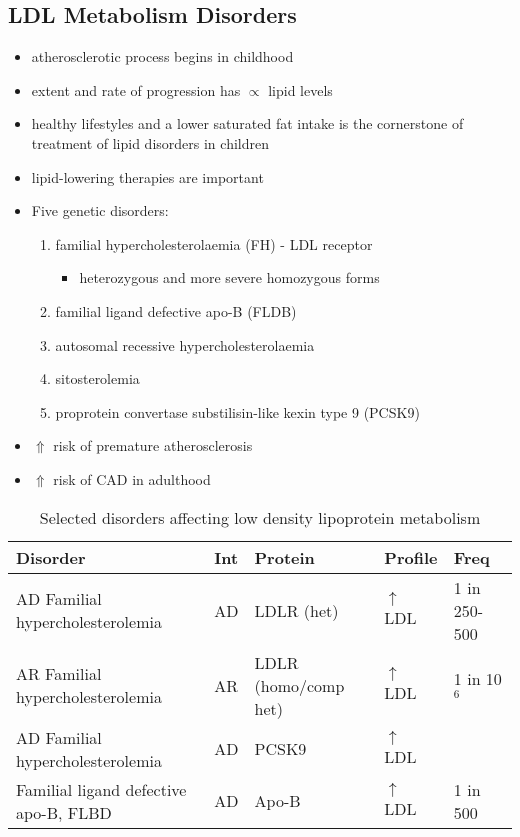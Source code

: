 \documentclass{scrartcl}
\begin{document}
\subsection{LDL Metabolism Disorders}
\label{sec:org0538d71}
\begin{itemize}
\item atherosclerotic process begins in childhood
\item extent and rate of progression has \(\propto\) lipid levels
\item healthy lifestyles and a lower saturated fat intake is the
cornerstone of treatment of lipid disorders in children
\item lipid-lowering therapies are important

\item Five genetic disorders:
\begin{enumerate}
\item familial hypercholesterolaemia (FH) - LDL receptor
\begin{itemize}
\item heterozygous and more severe homozygous forms
\end{itemize}
\item familial ligand defective apo-B (FLDB)
\item autosomal recessive hypercholesterolaemia
\item sitosterolemia
\item proprotein convertase substilisin-like kexin type 9 (PCSK9)
\end{enumerate}
\item \(\Uparrow\) risk of premature atherosclerosis
\item \(\Uparrow\) risk of CAD in adulthood
\end{itemize}

\begin{table}[htbp]
\caption{\label{tab:orgfcc75bd}
Selected disorders affecting low density lipoprotein metabolism}
\centering
\begin{tabular}{lllll}
Disorder & Int & Protein & Profile & Freq\\
\hline
AD Familial hypercholesterolemia & AD & LDLR (het) & \(\uparrow\) LDL & 1 in 250-500\\
AR Familial hypercholesterolemia & AR & LDLR (homo/comp het) & \(\uparrow\) LDL & 1 in 10\(^{\text{6}}\)\\
AD Familial hypercholesterolemia & AD & PCSK9 & \(\uparrow\) LDL & \\
Familial ligand defective apo-B, FLBD & AD & Apo-B & \(\uparrow\) LDL & 1 in 500\\
\end{tabular}
\end{table}
\end{document}
